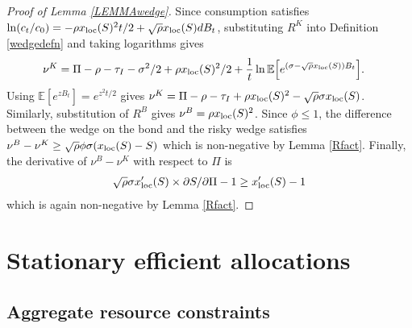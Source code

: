 \documentclass[11pt]{article}
\theoremstyle{plain}
\theoremstyle{definition} %
\begin{document}
\begin{proof}[Proof of Lemma \ref{LEMMAwedge}]
Since consumption satisfies $\ln(c_t/c_0) = -\rho x_{\textnormal{loc}}(S)^2t/2 + \sqrt{\rho} x_{\textnormal{loc}}(S) dB_t$, substituting $R^K$ into Definition \ref{wedgedefn} and taking logarithms gives
\begin{align*}
\nu^K & = \Pi - \rho - \tau_I - \sigma^2/2 + \rho x_{\textnormal{loc}}(S)^2/2 + \frac{1}{t}\ln \mathbb{E}{\left[ e^{(\sigma - \sqrt{\rho} x_{\textnormal{loc}}(S))B_t}\right]}.
\end{align*}
Using $\mathbb{E}[e^{zB_t}] = e^{z^2t/2}$ gives $\nu^K=\Pi-\rho-\tau_I+\rho x_{\textnormal{loc}}(S)^2 - \sqrt{\rho} \sigma x_{\textnormal{loc}}(S)$. Similarly, substitution of $R^B$ gives $\nu^B = \rho x_{\textnormal{loc}}(S)^2$. Since $\phi \leq 1$, the difference between the wedge on the bond and the risky wedge satisfies $\nu^B - \nu^K \geq \sqrt{\rho} \phi \sigma {\left(x_{\textnormal{loc}}(S) - S\right)}$ which is non-negative by Lemma \ref{Rfact}. Finally, the derivative of $\nu^B - \nu^K$ with respect to $\Pi$ is 
\begin{align*}
\sqrt{\rho} \sigma x_{\textnormal{loc}}'(S) \times \partial S/\partial \Pi - 1 \geq x_{\textnormal{loc}}'(S) - 1
\end{align*}
which is again non-negative by Lemma \ref{Rfact}.
\end{proof}


\section{Stationary efficient allocations} \label{STATdecent}
\subsection{Aggregate resource constraints}\label{ARESC}

\end{document}
